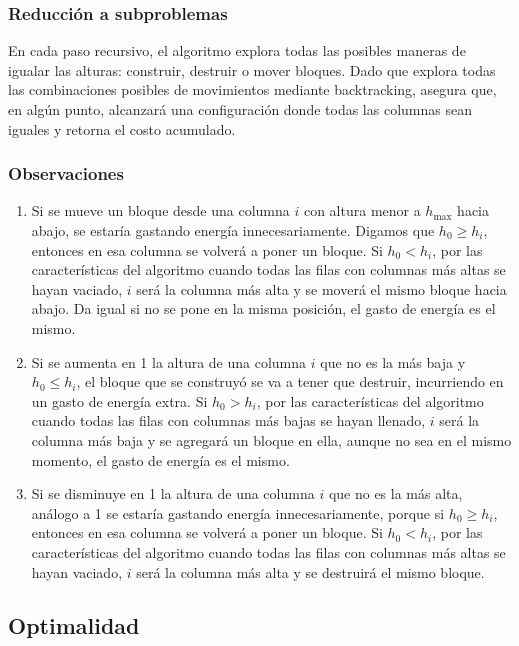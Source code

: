 \documentclass[a4paper,12pt]{article}
\begin{document}
\subsubsection{Reducción a subproblemas}
En cada paso recursivo, el algoritmo explora todas las posibles maneras de igualar las alturas: construir, destruir o mover bloques. Dado que explora todas las combinaciones posibles de movimientos mediante backtracking, asegura que, en algún punto, alcanzará una configuración donde todas las columnas sean iguales y retorna el costo acumulado.

\subsubsection{Observaciones}
\begin{enumerate}
	\item Si se mueve un bloque desde una columna \( i \) con altura menor a \( h_{\text{max}} \) hacia abajo, se estaría gastando energía innecesariamente. Digamos que \( h_0 \geq h_i \), entonces en esa columna se volverá a poner un bloque. Si \( h_0 < h_i \), por las características del algoritmo cuando todas las filas con columnas más altas se hayan vaciado, \( i \) será la columna más alta y se moverá el mismo bloque hacia abajo. Da igual si no se pone en la misma posición, el gasto de energía es el mismo.
	\item Si se aumenta en 1 la altura de una columna \( i \) que no es la más baja y \( h_0 \leq h_i \), el bloque que se construyó se va a tener que destruir, incurriendo en un gasto de energía extra. Si \( h_0 > h_i \), por las características del algoritmo cuando todas las filas con columnas más bajas se hayan llenado, \( i \) será la columna más baja y se agregará un bloque en ella, aunque no sea en el mismo momento, el gasto de energía es el mismo.
	\item Si se disminuye en 1 la altura de una columna \( i \) que no es la más alta, análogo a 1 se estaría gastando energía innecesariamente, porque si \( h_0 \geq h_i \), entonces en esa columna se volverá a poner un bloque. Si \( h_0 < h_i \), por las características del algoritmo cuando todas las filas con columnas más altas se hayan vaciado, \( i \) será la columna más alta y se destruirá el mismo bloque.
\end{enumerate}


\subsection{Optimalidad}
\end{document}
